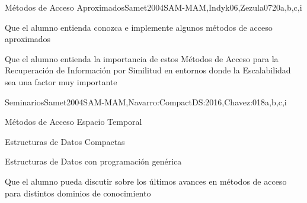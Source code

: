 \begin{syllabus}
\begin{unit}{Métodos de Acceso Aproximados}{}{Samet2004SAM-MAM,Indyk06,Zezula07}{20}{a,b,c,i}
   \begin{learningoutcomes}
         \item Que el alumno entienda conozca e implemente algunos métodos de acceso aproximados
         \item Que el alumno entienda la importancia de estos Métodos de Acceso para la Recuperación de Información por Similitud en entornos donde la Escalabilidad sea una factor muy importante
   \end{learningoutcomes}
\end{unit}

\begin{unit}{Seminarios}{}{Samet2004SAM-MAM,Navarro:CompactDS:2016,Chavez:01}{8}{a,b,c,i}
	\begin{topics}
         \item Métodos de Acceso Espacio Temporal
         \item Estructuras de Datos Compactas
         \item Estructuras de Datos con programación genérica
   \end{topics}

   \begin{learningoutcomes}
         \item Que el alumno pueda discutir sobre los últimos avances en métodos de acceso para distintos dominios de conocimiento
   \end{learningoutcomes}
\end{unit}

\begin{coursebibliography}
\end{coursebibliography}

\end{syllabus}
